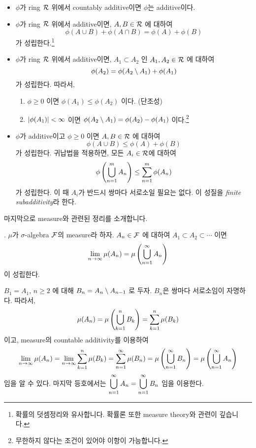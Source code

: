 \begin{itemize}
    \item \(\phi\)가 ring \(\mathcal{R}\) 위에서 countably additive이면 \(\phi\)는 additive이다.

    \item \(\phi\)가 ring \(\mathcal{R}\) 위에서 additive이면, \(A, B \in \mathcal{R}\) 에 대하여
          \[
              \phi(A\cup B) + \phi(A\cap B) = \phi(A) + \phi(B)
          \]
          가 성립한다.\footnote{확률의 덧셈정리와 유사합니다. 확률론 또한 measure theory와 관련이 깊습니다.}

    \item \(\phi\)가 ring \(\mathcal{R}\) 위에서 additive이면, \(A_1 \subset A_2\) 인 \(A_1, A_2 \in \mathcal{R}\) 에 대하여
          \[
              \phi(A_2) = \phi(A_2 \setminus A_1) + \phi(A_1)
          \]
          가 성립한다. 따라서,
          \begin{enumerate}
              \item \(\phi \geq 0\) 이면 \(\phi(A_1) \leq \phi(A_2)\) 이다. (단조성)
              \item \(\left| \phi(A_1) \right| < \infty\) 이면 \(\phi(A_2 \setminus A_1) = \phi(A_2) - \phi(A_1)\) 이다.\footnote{무한하지 않다는 조건이 있어야 이항이 가능합니다.}
          \end{enumerate}

    \item \(\phi\)가 additive이고 \(\phi \geq 0\) 이면 \(A, B \in \mathcal{R}\) 에 대하여
          \[
              \phi(A\cup B) \leq \phi(A) + \phi(B)
          \]
          가 성립한다. 귀납법을 적용하면, 모든 \(A_i \in \mathcal{R}\)에 대하여
          \[
              \phi\left( \bigcup_{n=1}^m A_n \right) \leq \sum_{n=1}^m \phi(A_n)
          \]
          가 성립한다. 이 때 \(A_i\)가 반드시 쌍마다 서로소일 필요는 없다. 이 성질을 \textit{finite subadditivity}라 한다.
\end{itemize}

마지막으로 measure와 관련된 정리를 소개합니다.

\thm. \(\mu\)가 \(\sigma\)-algebra \(\mathcal{F}\)의 measure라 하자. \(A_n \in \mathcal{F}\) 에 대하여 \(A_1 \subset A_2 \subset \cdots\) 이면
\[
    \lim_{n\rightarrow\infty} \mu(A_n) = \mu\left( \bigcup_{n=1}^\infty A_n \right)
\]
이 성립한다.

\pf \(B_1 = A_1\), \(n \geq 2\) 에 대해 \(B_n = A_n \setminus A_{n-1}\) 로 두자. \(B_n\)은 쌍마다 서로소임이 자명하다. 따라서,
\[
    \mu(A_n) = \mu\left( \bigcup_{k=1}^n B_k \right) = \sum_{k=1}^n \mu(B_k)
\]
이고, measure의 countable additivity를 이용하여
\[
    \lim_{n\rightarrow\infty} \mu(A_n) = \lim_{n\rightarrow\infty} \sum_{k=1}^n \mu(B_k) = \sum_{n=1}^\infty \mu(B_n) = \mu\left( \bigcup_{n=1}^{\infty} B_n \right) = \mu\left( \bigcup_{n=1}^\infty A_n \right)
\]
임을 알 수 있다. 마지막 등호에서는 \(\displaystyle \bigcup_{n=1}^\infty A_n = \bigcup_{n=1}^\infty B_n\) 임을 이용한다.

